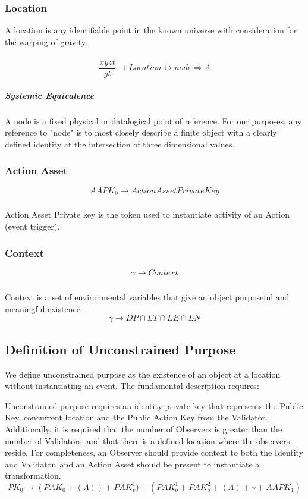 \documentclass{article}
\begin{document}
\subsubsection{Location}
	A location is any identifiable point in the known universe with consideration for the warping of gravity.
		\paragraph{}
			\begin{equation}
				\frac{xyzt}{gt} \rightarrow Location \leftrightarrow node \Rightarrow \Lambda
			\end{equation}
		\subparagraph{Systemic Equivalence}
			A node is a fixed physical or datalogical point of reference.  For our purposes, any reference to "node" is to most closely describe a finite object with a clearly defined identity at the intersection of three dimensional values.
			

\subsubsection{Action Asset}
		\begin{equation}
			AAPK_0 \rightarrow Action Asset Private Key
		\end{equation}
		\subparagraph{}
			Action Asset Private key is the token used to instantiate activity of an Action (event trigger).	

\subsubsection{Context}
		\begin{equation}
		\gamma \rightarrow Context
		\end{equation}
		\subparagraph{}
			Context is a set of environmental variables that give an object purposeful and meaningful existence.
			\begin{equation}
				\gamma \rightarrow DP \cap LT \cap LE \cap LN
			\end{equation}
	
\subsection{Definition of Unconstrained Purpose}
		We define unconstrained purpose as the existence of an object at a location without instantiating an event.  The fundamental description requires:



Unconstrained purpose requires an identity private key that represents the Public Key, concurrent location and the Public Action Key from the Validator.  Additionally, it is required that the number of Observers is greater than the number of Validators, and that there is a defined location where the observers reside. For completeness, an Observer should provide context to both the Identity and Validator, and an Action Asset should be present to instantiate a transformation.
		\begin{equation}
			PK_0 \rightarrow (PAK_0 + (\Lambda)) + PAK^1_v) + (PAK_o^1 + PAK_o^2 + (\Lambda) + {\gamma} + {AAPK_1})
		\end{equation}
\end{document}
